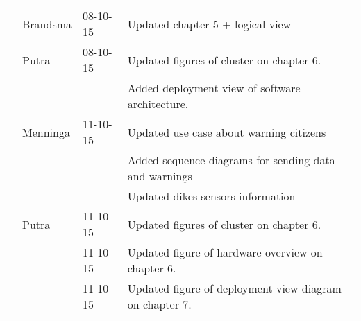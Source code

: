 \begin{longtable}{L{} L{} L{} L{}}
	                 & Brandsma              & 08-10-15      & Updated chapter 5 + logical view                                                                                                                                                                                           \\
	                 & Putra                 & 08-10-15      & Updated figures of cluster on chapter 6.                                                                                                                                                                                   \\
	                 &                       &               & Added deployment view of software architecture.                                                                                                                                                                            \\
	                 & Menninga              & 11-10-15      & Updated use case about warning citizens                                                                                                                                                                                    \\
	                 &                       &               & Added sequence diagrams for sending data and warnings                                                                                                                                                                      \\
	                 &                       &               & Updated dikes sensors information                                                                                                                                                                                          \\
	                 & Putra                 & 11-10-15      & Updated figures of cluster on chapter 6.                                                                                                                                                                                   \\
	                 &                       & 11-10-15      & Updated figure of hardware overview on chapter 6.                                                                                                                                                                          \\
	                 &                       & 11-10-15      & Updated figure of deployment view diagram on chapter 7.                                                                                                                                                                    \\

\end{longtable}
